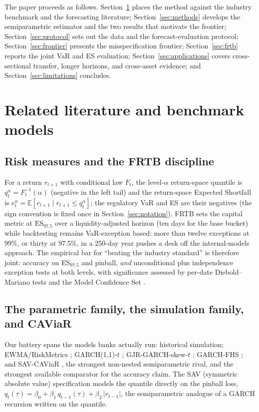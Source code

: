 \documentclass[11pt]{article}
\newcommand{\ES}{\mathrm{ES}}
\theoremstyle{remark}
\begin{document}
\medskip\noindent The paper proceeds as follows.
Section~\ref{sec:background} places the method against the industry
benchmark and the forecasting literature; Section~\ref{sec:methods}
develops the semiparametric estimator and the two results that motivate
the frontier; Section~\ref{sec:protocol} sets out the data and the
forecast-evaluation protocol; Section~\ref{sec:frontier} presents the
misspecification frontier; Section~\ref{sec:frtb} reports the joint VaR
and ES evaluation; Section~\ref{sec:applications} covers cross-sectional
transfer, longer horizons, and cross-asset evidence; and
Section~\ref{sec:limitations} concludes.

\section{Related literature and benchmark models}\label{sec:background}

\subsection{Risk measures and the FRTB discipline}

For a return $r_{t+1}$ with conditional law $F_t$, the level-$\alpha$
return-space quantile is $q_t^\alpha = F_t^{-1}(\alpha)$ (negative in
the left tail) and the return-space Expected Shortfall is
$e_t^\alpha = \mathbb{E}[r_{t+1} \mid r_{t+1} \le q_t^\alpha]$;
the regulatory VaR and ES are their negatives (the sign convention is
fixed once in Section~\ref{sec:notation}). FRTB
\citep{bcbs2019frtb} sets the
capital metric at $\ES_{97.5}$ over a liquidity-adjusted horizon (ten
days for the base bucket) while backtesting remains VaR-exception based:
more than twelve exceptions at 99\%, or thirty at 97.5\%, in a 250-day
year pushes a desk off the internal-models approach. The empirical bar
for ``beating the industry standard'' is
therefore joint: accuracy on ES$_{97.5}$ and pinball, \emph{and}
unconditional \citep{kupiec1995} plus independence
\citep{christoffersen1998} exception tests at both levels, with
significance assessed by per-date Diebold--Mariano tests
\citep{dieboldmariano1995} and the Model Confidence Set
\citep{hansen2011mcs}.

\subsection{The parametric family, the simulation family, and CAViaR}

Our battery spans the models banks actually run: historical simulation;
EWMA/RiskMetrics \citep{zumbach2007}; GARCH(1,1)-$t$
\citep{bollerslev1986}; GJR-GARCH-skew-$t$ \citep[adding leverage and
skewness;][]{glosten1993};
GARCH-FHS \citep[parametric scale, empirical standardized residuals, the volatile-regime best practice;][]{baroneadesi1999fhs}; and SAV-CAViaR
\citep{engle2004caviar}, the strongest non-nested semiparametric
rival, and the strongest available comparator for the accuracy claim.
The SAV (symmetric absolute value) specification models the quantile
directly on the pinball loss,
$q_t(\tau) = \beta_0 + \beta_1\, q_{t-1}(\tau) + \beta_2\,|r_{t-1}|$, the
semiparametric analogue of a GARCH recursion written on the quantile.
\end{document}

